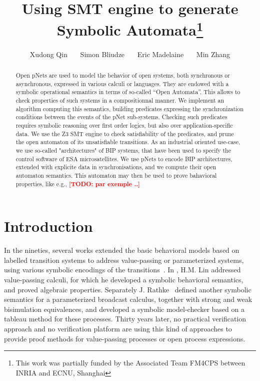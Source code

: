 \documentclass{lncs/llncs}
\title{Using SMT engine to generate Symbolic Automata\thanks{This work was partially 
funded by the Associated Team FM4CPS
  between INRIA and ECNU, Shanghai}}
\author{ Xudong Qin\inst{1,2}  \ \ \  Simon Bliudze\inst{3} \ \ \ Eric Madelaine\inst{1}
  \ \ \  Min Zhang\inst{2}}
\institute{Universit\'e C\^ote d'Azur, Inria, CNRS, I3S, 06902 Sophia Antipolis, France
        \and Shanghai Key Laboratory of Trustworthy Computing, ECNU, China
\and INRIA Lille }
\date{}                                           %
\newcommand{\TODO}[1]{\textcolor{red}{\textbf{[TODO:#1]}}}
\begin{document}
\maketitle



\begin{abstract}
Open pNets are used to model the behavior of open systems, both
synchronous or asynchronous, expressed in various calculi or
languages. They are endowed with a symbolic operational semantics in
terms of so-called ``Open Automata''. This allows to check properties of
such systems in a compositionnal manner. 
We implement an algorithm computing this semantics,
building predicates expressing the synchronization conditions
between the events of the pNet sub-systems. Checking such
predicates requires symbolic reasoning over first order logics, but
also over application-specific data. We use the Z3 SMT engine to check
satisfiability of the predicates, and prune the open automaton of its
unsatisfiable transitions.
As an industrial oriented use-case, we use so-called "architectures"
of BIP systems, that have been used to specify the control software of
ESA microsatellites. We use pNets to encode BIP architectures,
extended with explicite data in synchronisations, and we compute their
open automaton semantics. This automaton may then be used to prove
bahavioral properties, like e.g., \TODO{ par exemple ..} 

  

\end{abstract}


\section{Introduction}

In the nineties, several 
works extended the basic behavioral models based on labelled
transition systems to address value-passing or parameterized systems, using
various symbolic encodings of the
transitions~\cite{deSimone85,Larsen87,HennessyLin:TCS95,Linconcur96}. 
In \cite{Linconcur96}, H.M. Lin addressed value-passing calculi, for which he
developed a symbolic behavioral semantics, and proved algebraic properties.
Separately J. Rathke~\cite{HennessyRathke:TCS98} defined another
symbolic semantics for 
a parameterized broadcast calculus, together with strong and weak bisimulation
equivalences, and developed a symbolic model-checker based on a tableau
method for these processes. Thirty years later, no
practical verification approach and no verification platform are
using this kind of approaches to provide proof methods for
value-passing processes or open process expressions. 
\end{document}
